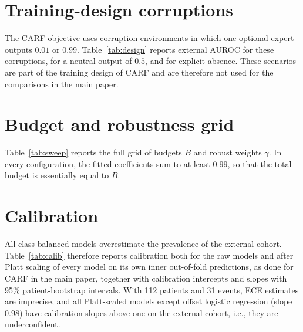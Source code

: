 \documentclass[runningheads]{llncs}
\begin{document}
\section{Training-design corruptions}

The CARF objective uses corruption environments in which one optional expert outputs $0.01$ or $0.99$. Table~\ref{tab:design} reports external AUROC for these corruptions, for a neutral output of $0.5$, and for explicit absence. These scenarios are part of the training design of CARF and are therefore not used for the comparisons in the main paper.

\begin{table}[h]
\centering
\caption{External AUROC under the corruptions used in CARF training, a neutral output ($0.5$), and absence of one or both optional modalities.}
\label{tab:design}
\small
{}
\end{table}

\section{Budget and robustness grid}

Table~\ref{tab:sweep} reports the full grid of budgets $B$ and robust weights $\gamma$. In every configuration, the fitted coefficients sum to at least 0.99, so that the total budget is essentially equal to $B$.

\begin{table}[h]
\centering
\caption{CARF refitted on a grid of budgets $B$ and robust weights $\gamma$. Internal AUROC is the mean $\pm$ SD over the 25 outer folds; external AUROC is reported on intact inputs and with a permuted transcriptomic output (mean of 30 realizations); $b_R$ and $b_M$ are the fitted modality budgets of the external model.}
\label{tab:sweep}
\small
{}
\end{table}

\section{Calibration}

All class-balanced models overestimate the prevalence of the external cohort. Table~\ref{tab:calib} therefore reports calibration both for the raw models and after Platt scaling of every model on its own inner out-of-fold predictions, as done for CARF in the main paper, together with calibration intercepts and slopes with 95\% patient-bootstrap intervals. With 112 patients and 31 events, ECE estimates are imprecise, and all Platt-scaled models except offset logistic regression (slope 0.98) have calibration slopes above one on the external cohort, i.e., they are underconfident.
\end{document}
